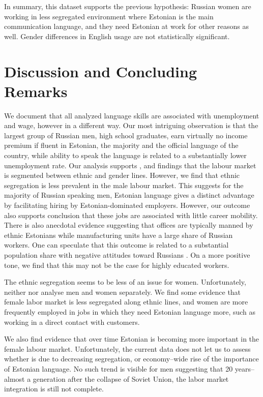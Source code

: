 \documentclass[12pt, a4paper]{article}
\begin{document}
In summary, this dataset supports the previous hypothesis: Russian women are
working in less segregated environment where Estonian is the main
communication language, and they need Estonian at work for other reasons as
well.  Gender differences in English usage are not statistically
significant.


\section{Discussion and Concluding Remarks}
\label{sec:discussion}

We document that all analyzed language skills are associated with
unemployment and wage, however in a different way. Our most
intriguing observation is that the largest group of
Russian men, high school graduates, earn virtually no income premium if fluent in Estonian,
the majority and the official language of the country, while ability
to speak the language is related to a substantially
lower unemployment rate.
Our analysis supports \citet{YaoandOurs2015}, and \citet{Lindemann2013} findings that 
the labour market is segmented between ethnic and gender lines.
However, we find that ethnic segregation is less prevalent in the male
labour market.
This suggests for the majority of Russian speaking men, Estonian
language gives a distinct advantage by facilitating hiring by
Estonian-dominated employers.  However, our outcome also supports 
\citet{leppik+vihalemm2015JofBaltStud} conclusion that
these
jobs are associated with little career mobility.  There is also
anecdotal evidence suggesting that offices are
typically manned by ethnic Estonians while manufacturing units have a
large share of Russian workers.
One can speculate that this outcome is related to a substantial population share
with negative attitudes toward Russians \citep{korts2009JofBaltStud}.
On a more positive tone, we find
that this may not be the case for highly educated workers.

The ethnic segregation seems to be less of an issue for women.
Unfortunately, neither \citet{Toomet2011} nor
\citet{leppik+vihalemm2015JofBaltStud} analyse men and women
separately.  We find some evidence that female labor market is less
segregated along ethnic lines, and women are more frequently employed in jobs in which they need Estonian
language more, such as working in a direct contact with customers.

We also find evidence that over time Estonian is becoming more
important in the female labour market.  Unfortunately, the current data
does not let us to assess whether is due to decreasing segregation, or
economy--wide rise of the importance of Estonian language.  No such trend is visible for
men suggesting that 20 years--almost a generation after the collapse of Soviet Union, the
labor market integration is still not complete.
\end{document}
